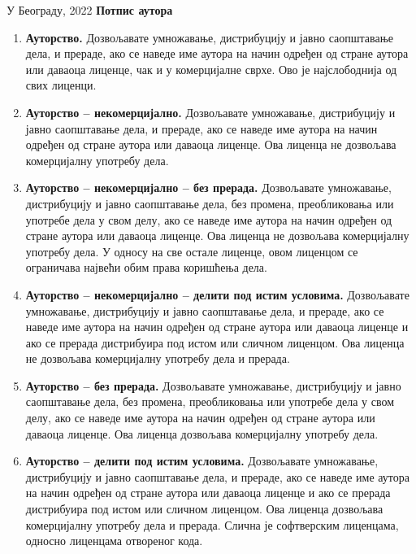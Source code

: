 \vfill

 
У Београду, \hspace{1cm} 2022  \hfill  \textbf{Потпис
аутора\hspace{2cm}\mbox{}}

\vspace{.5cm}
\hspace{10cm}\hrulefill 

\hspace{\fill}

\pagebreak
\thispagestyle{empty}


\begin{enumerate}[leftmargin=0.5cm]
\item \textbf{Ауторство.} Дозвољавате умножавање, дистрибуцију и јавно 
саопштавање дела, и 
прераде, ако се наведе име аутора на начин одређен од стране аутора или даваоца 
лиценце, чак и у комерцијалне сврхе. Ово је најслободнија од свих лиценци.
\item \textbf{Ауторство -- некомерцијално.} Дозвољавате умножавање, 
дистрибуцију и јавно 
саопштавање дела, и прераде, ако се наведе име аутора на начин одређен од 
стране 
аутора или даваоца лиценце. Ова лиценца не дозвољава комерцијалну употребу дела.
\item \textbf{Ауторство -- некомерцијално -- без прерада.} Дозвољавате 
умножавање, 
дистрибуцију и јавно саопштавање дела, без промена, преобликовања или употребе 
дела у свом делу, ако се наведе име аутора на начин одређен од стране аутора 
или 
даваоца лиценце. Ова лиценца не дозвољава комерцијалну употребу дела. У односу 
на све остале лиценце, овом лиценцом се ограничава највећи обим права коришћења 
дела. 
\item \textbf{Ауторство -- некомерцијално -- делити под истим условима.} 
Дозвољавате умножавање, дистрибуцију и јавно саопштавање дела, и прераде, ако се 
наведе име 
аутора на начин одређен од стране аутора или даваоца лиценце и ако се прерада 
дистрибуира под истом или сличном лиценцом. Ова лиценца не дозвољава 
комерцијалну употребу дела и прерада.
\item \textbf{Ауторство -- без прерада.} Дозвољавате умножавање, дистрибуцију и 
јавно 
саопштавање дела, без промена, преобликовања или употребе дела у свом делу, ако 
се наведе име аутора на начин одређен од стране аутора или даваоца лиценце. Ова 
лиценца дозвољава комерцијалну употребу дела.
\item \textbf{Ауторство -- делити под истим условима.} Дозвољавате умножавање, 
дистрибуцију и 
јавно саопштавање дела, и прераде, ако се наведе име аутора на начин одређен од 
стране аутора или даваоца лиценце и ако се прерада дистрибуира под истом или 
сличном лиценцом. Ова лиценца дозвољава комерцијалну употребу дела и прерада. 
Слична је софтверским лиценцама, односно лиценцама отвореног кода.               
\end{enumerate}
